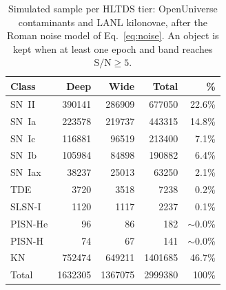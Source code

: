 \begin{table}[!htb]
    \centering
    \caption{Simulated sample per HLTDS tier: OpenUniverse contaminants and LANL kilonovae, after the Roman noise model of Eq.~\ref{eq:noise}. An object is kept when at least one epoch and band reaches $\mathrm{S/N} \geq 5$.}
    \label{tab:class_distribution}
    \begin{tabular}{lrrrr}
        \hline
        Class & Deep & Wide & Total & \% \\
        \hline
        SN~II    & 390141 & 286909 &  677050 & 22.6\% \\
        SN~Ia    & 223578 & 219737 &  443315 & 14.8\% \\
        SN~Ic    & 116881 &  96519 &  213400 & 7.1\% \\
        SN~Ib    & 105984 &  84898 &  190882 & 6.4\% \\
        SN~Iax   &  38237 &  25013 &   63250 & 2.1\% \\
        TDE      &   3720 &   3518 &    7238 & 0.2\% \\
        SLSN-I   &   1120 &   1117 &    2237 & 0.1\% \\
        PISN-He  &     96 &     86 &     182 & $\sim$0.0\% \\
        PISN-H   &     74 &     67 &     141 & $\sim$0.0\% \\
        \hline
        KN       & 752474 & 649211 & 1401685 & 46.7\% \\
        \hline
        Total    & 1632305 & 1367075 & 2999380 & 100\% \\
        \hline
    \end{tabular}
\end{table}
